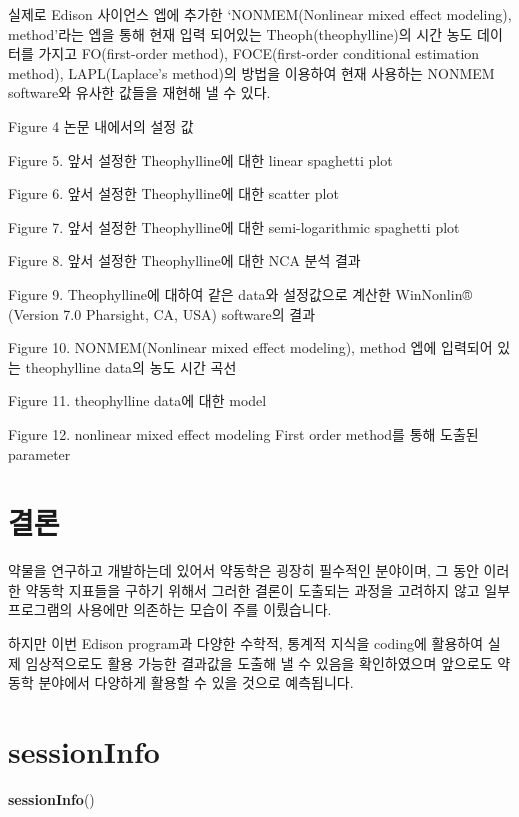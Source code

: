 \documentclass[12pt,]{krantz}
\newenvironment{Shaded}{\begin{snugshade}}{\end{snugshade}}
\newcommand{\KeywordTok}[1]{\textcolor[rgb]{0.13,0.29,0.53}{\textbf{#1}}}
\newcommand{\NormalTok}[1]{#1}
\theoremstyle{definition}
\theoremstyle{definition}
\theoremstyle{definition}
\theoremstyle{remark}
\begin{document}
실제로 Edison 사이언스 엡에 추가한 `NONMEM(Nonlinear mixed effect
modeling), method'라는 엡을 통해 현재 입력 되어있는
Theoph(theophylline)의 시간 농도 데이터를 가지고 FO(first-order method),
FOCE(first-order conditional estimation method), LAPL(Laplace's
method)의 방법을 이용하여 현재 사용하는 NONMEM software와 유사한 값들을
재현해 낼 수 있다.

Figure 4 논문 내에서의 설정 값

Figure 5. 앞서 설정한 Theophylline에 대한 linear spaghetti plot

Figure 6. 앞서 설정한 Theophylline에 대한 scatter plot

Figure 7. 앞서 설정한 Theophylline에 대한 semi-logarithmic spaghetti
plot

Figure 8. 앞서 설정한 Theophylline에 대한 NCA 분석 결과

Figure 9. Theophylline에 대하여 같은 data와 설정값으로 계산한 WinNonlin®
(Version 7.0 Pharsight, CA, USA) software의 결과

Figure 10. NONMEM(Nonlinear mixed effect modeling), method 엡에 입력되어
있는 theophylline data의 농도 시간 곡선

Figure 11. theophylline data에 대한 model

Figure 12. nonlinear mixed effect modeling First order method를 통해
도출된 parameter

\chapter{결론}\label{conclusion}

약물을 연구하고 개발하는데 있어서 약동학은 굉장히 필수적인 분야이며, 그
동안 이러한 약동학 지표들을 구하기 위해서 그러한 결론이 도출되는 과정을
고려하지 않고 일부 프로그램의 사용에만 의존하는 모습이 주를 이뤘습니다.

하지만 이번 Edison program과 다양한 수학적, 통계적 지식을 coding에
활용하여 실제 임상적으로도 활용 가능한 결과값을 도출해 낼 수 있음을
확인하였으며 앞으로도 약동학 분야에서 다양하게 활용할 수 있을 것으로
예측됩니다.

\appendix {}


\chapter*{sessionInfo}\label{sessioninfo}


\begin{Shaded}
\begin{Highlighting}[]
\KeywordTok{sessionInfo}\NormalTok{()}
\end{Highlighting}
\end{Shaded}
\end{document}
